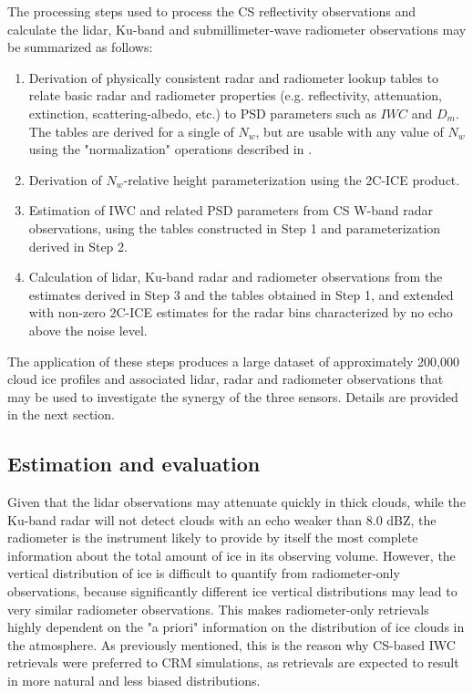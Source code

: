 \documentclass{ametsocV6.1}
\begin{document}
The processing steps used to process the CS reflectivity observations and calculate the lidar, Ku-band and 
submillimeter-wave radiometer observations may be summarized as follows:
\begin{enumerate}
\item Derivation of physically consistent radar and radiometer lookup tables to relate basic radar and 
radiometer properties (e.g. reflectivity, attenuation, extinction, scattering-albedo, etc.) to PSD parameters 
such as $IWC$ and $D_m$. The tables are derived for a single of $N_w$, but are usable with any value of 
$N_w$ using the "normalization" operations described in \citep{grecu2011}.
\item Derivation of $N_w$-relative height parameterization using the 2C-ICE product.
\item Estimation of IWC and related PSD parameters from CS W-band radar observations, using the tables 
constructed
in Step 1 and parameterization derived in Step 2.
\item Calculation of lidar, Ku-band radar and radiometer observations from the estimates derived in Step 3 
and the tables obtained in Step 1, and extended with non-zero 2C-ICE estimates for the radar bins characterized by no echo
above the noise level.
\end{enumerate}

The application of these steps produces a large dataset of approximately 200,000 cloud ice profiles and 
associated lidar, radar and radiometer observations that may be used to investigate the synergy of the three 
sensors. Details are provided in the next section.

\subsection{Estimation and evaluation}
Given that the lidar observations may attenuate quickly in thick clouds, while the Ku-band radar will not detect
clouds with an echo weaker than 8.0 dBZ, the radiometer is the instrument likely to provide by itself the most 
complete information about the total amount of ice in its observing volume.  However, the vertical distribution 
of ice is difficult to quantify from radiometer-only observations, because significantly different ice vertical 
distributions may lead to very similar radiometer observations.  This makes radiometer-only retrievals highly 
dependent on the "a priori" information on the distribution of ice clouds in the atmosphere. As previously 
mentioned, this is the reason why CS-based IWC retrievals were preferred to CRM simulations, as retrievals are 
expected to result in more natural and less biased distributions. 
\end{document}
